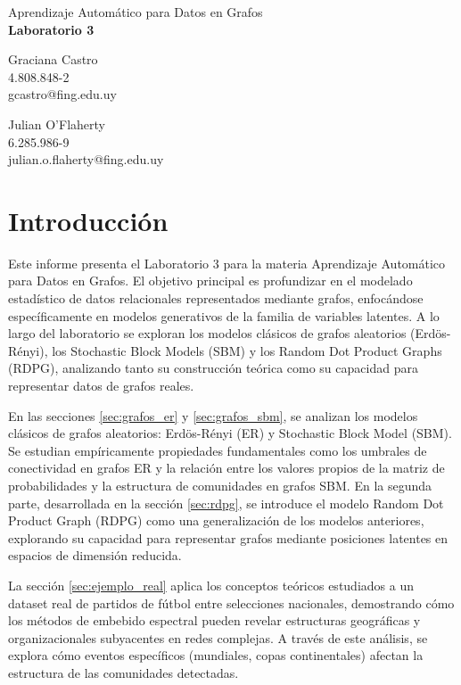 \documentclass{article}
\begin{document}
\begin{center}
    {\Large Aprendizaje Automático para Datos en Grafos} \\
    {\LARGE \textbf{Laboratorio 3}} \\
    \vspace{2em}
    \begin{minipage}{0.45\textwidth}
        \centering
        Graciana Castro \\
        4.808.848-2 \\
        gcastro@fing.edu.uy
    \end{minipage}
    \hfill
    \begin{minipage}{0.45\textwidth}
        \centering
        Julian O'Flaherty \\
        6.285.986-9 \\
        julian.o.flaherty@fing.edu.uy
    \end{minipage}
\end{center}


\section{Introducción}

Este informe presenta el Laboratorio 3 para la materia Aprendizaje Automático para Datos en Grafos. El objetivo principal es profundizar en el modelado estadístico de datos relacionales representados mediante grafos, enfocándose específicamente en modelos generativos de la familia de variables latentes. A lo largo del laboratorio se exploran los modelos clásicos de grafos aleatorios (Erdös-Rényi), los Stochastic Block Models (SBM) y los Random Dot Product Graphs (RDPG), analizando tanto su construcción teórica como su capacidad para representar datos de grafos reales. 

En las secciones \ref{sec:grafos_er} y \ref{sec:grafos_sbm}, se analizan los modelos clásicos de grafos aleatorios: Erdös-Rényi (ER) y Stochastic Block Model (SBM). Se estudian empíricamente propiedades fundamentales como los umbrales de conectividad en grafos ER y la relación entre los valores propios de la matriz de probabilidades y la estructura de comunidades en grafos SBM. En la segunda parte, desarrollada en la sección \ref{sec:rdpg}, se introduce el modelo Random Dot Product Graph (RDPG) como una generalización de los modelos anteriores, explorando su capacidad para representar grafos mediante posiciones latentes en espacios de dimensión reducida.

La sección \ref{sec:ejemplo_real} aplica los conceptos teóricos estudiados a un dataset real de partidos de fútbol entre selecciones nacionales, demostrando cómo los métodos de embebido espectral pueden revelar estructuras geográficas y organizacionales subyacentes en redes complejas. A través de este análisis, se explora cómo eventos específicos (mundiales, copas continentales) afectan la estructura de las comunidades detectadas.
\end{document}
